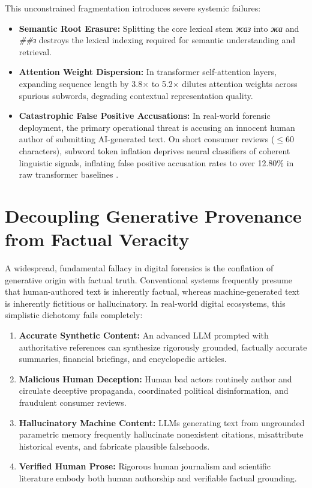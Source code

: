 This unconstrained fragmentation introduces severe systemic failures:
\begin{itemize}
    \item \textbf{Semantic Root Erasure:} Splitting the core lexical stem \textit{жаз} into \textit{жа} and \textit{\#\#з} destroys the lexical indexing required for semantic understanding and retrieval.
    \item \textbf{Attention Weight Dispersion:} In transformer self-attention layers, expanding sequence length by 3.8$\times$ to 5.2$\times$ dilutes attention weights across spurious subwords, degrading contextual representation quality.
    \item \textbf{Catastrophic False Positive Accusations:} In real-world forensic deployment, the primary operational threat is accusing an innocent human author of submitting AI-generated text. On short consumer reviews ($\le 60$ characters), subword token inflation deprives neural classifiers of coherent linguistic signals, inflating false positive accusation rates to over 12.80\% in raw transformer baselines \citep{liang2023gptdetectors}.
\end{itemize}

\section{Decoupling Generative Provenance from Factual Veracity}
\label{sec:intro_decoupling}

A widespread, fundamental fallacy in digital forensics is the conflation of generative origin with factual truth. Conventional systems frequently presume that human-authored text is inherently factual, whereas machine-generated text is inherently fictitious or hallucinatory. In real-world digital ecosystems, this simplistic dichotomy fails completely:
\begin{enumerate}
    \item \textbf{Accurate Synthetic Content:} An advanced LLM prompted with authoritative references can synthesize rigorously grounded, factually accurate summaries, financial briefings, and encyclopedic articles.
    \item \textbf{Malicious Human Deception:} Human bad actors routinely author and circulate deceptive propaganda, coordinated political disinformation, and fraudulent consumer reviews.
    \item \textbf{Hallucinatory Machine Content:} LLMs generating text from ungrounded parametric memory frequently hallucinate nonexistent citations, misattribute historical events, and fabricate plausible falsehoods.
    \item \textbf{Verified Human Prose:} Rigorous human journalism and scientific literature embody both human authorship and verifiable factual grounding.
\end{enumerate}

